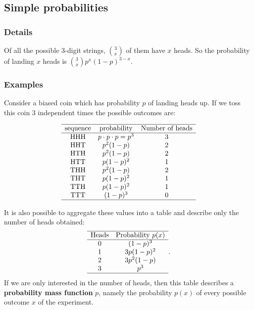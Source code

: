 \documentclass[12pt,a4paper]{article}
\theoremstyle{regla}
\theoremstyle{remark}
\theoremstyle{definition}
\theoremstyle{nonumberbreak}
\begin{document}
\subsection{Simple probabilities}
\subsubsection{Details}
Of all the possible 3-digit strings, $\binom{3}{x}$ of them have $x$ heads. So the probability of landing $x$ heads is $\binom{3}{x}p^x(1-p)^{3-x}$.
\subsubsection{Examples}
\begin{xmpl}
Consider a biased coin which has probability $p$ of landing heads up. If we toss this coin 3 independent times the possible outcomes are:

$$
\begin{array}{c c c}
  \hline
  \text{sequence} & \text{probability}	& \text{Number of heads}\\
  \hline				
  \text{HHH} & p \cdot p \cdot p=p^3 & 3\\
  \text{HHT} & p^2(1-p) & 2\\
  \text{HTH} & p^2(1-p) & 2 \\
  \text{HTT} & p(1-p)^2 & 1\\
  \text{THH} & p^2(1-p) & 2\\
  \text{THT} & p(1-p)^2 & 1\\	
  \text{TTH} & p(1-p)^2 & 1\\
  \text{TTT} & (1-p)^3 & 0\\
  \hline
\end{array}
$$
\end{xmpl}

\begin{xmpl}
It is also possible to aggregate these values into a table and describe only the number of heads obtained:
$$
\begin{array}{c c}
  \hline
  \text{Heads} & \text{Probability}\ p(x)\\
  \hline				
  0 & (1-p)^3\\
  1 & 3p(1-p)^2\\
  2 & 3p^2(1-p)\\
  3 & p^3 \\
  \hline
\end{array}.
$$
If we are only interested in the number of heads, then
this table describes a \textbf{probability mass function} $p$, namely the probability $p(x)$ of every possible outcome $x$
of the experiment.
\end{xmpl}
\end{document}
